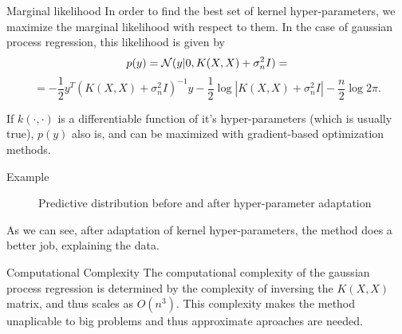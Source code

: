 		\begin{frame}{Marginal likelihood}
			In order to find the best set of kernel hyper-parameters, we maximize the marginal likelihood with respect to them. In the case of gaussian process regression, this likelihood is given by
			$$p(y) = \mathcal{N}(y| 0, K(X, X) + \sigma_n^2 I) = $$
			$$ = -\frac 1 2 y^{T} (K(X, X) + \sigma_n^2 I)^{-1} y - \frac 1 2 \log |K(X, X) + \sigma_n^2 I| - \frac n 2 \log 2 \pi.$$

			If $k(\cdot, \cdot)$ is a differentiable function of it's hyper-parameters (which is usually true), $p(y)$ also is, and can be maximized with gradient-based optimization methods.
		\end{frame}

		\begin{frame}{Example}

			\begin{figure}[!h]
				\centering
				\subfloat{
					\scalebox{0.5}{
						
					}
				}
				\subfloat{
					\scalebox{0.5}{
						
					}
				}
				\caption{Predictive distribution before and after hyper-parameter adaptation}
			\end{figure}

			As we can see, after adaptation of kernel hyper-parameters, the method does a better job, explaining the data.
		\end{frame}

		\begin{frame}{Computational Complexity}
			The computational complexity of the gaussian process regression is determined by the complexity of inversing the $K(X, X)$ matrix, and thus scales as $O(n^3)$. This complexity makes the method unaplicable to big problems and thus approximate aproaches are needed.
		\end{frame}